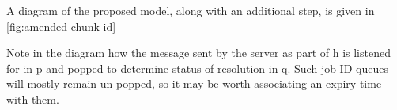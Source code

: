 A diagram of the proposed model, along with an additional 
step, is given in \cref{fig:amended-chunk-id}


Note in the diagram how the message sent by the server as part of
\textcolor{dark2-1}{h} is listened for in \textcolor{dark2-6}{p} and popped to
determine status of resolution in \textcolor{dark2-6}{q}.
Such job ID queues will mostly remain un-popped, so it may be worth associating
an expiry time with them.

